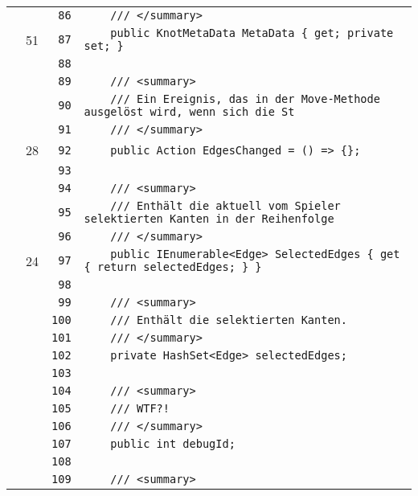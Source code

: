\documentclass[a4paper,10pt]{article}
\begin{document}
\begin{longtable}[l]{lrrl}
\cellcolor{gray} &  & \verb~86~ & \verb~    /// </summary>~\\
\cellcolor{green} & 51 & \verb~87~ & \verb~    public KnotMetaData MetaData { get; private set; }~\\
\cellcolor{gray} &  & \verb~88~ & \verb~~\\
\cellcolor{gray} &  & \verb~89~ & \verb~    /// <summary>~\\
\cellcolor{gray} &  & \verb~90~ & \verb~    /// Ein Ereignis, das in der Move-Methode ausgelöst wird, wenn sich die St~\\
\cellcolor{gray} &  & \verb~91~ & \verb~    /// </summary>~\\
\cellcolor{green} & 28 & \verb~92~ & \verb~    public Action EdgesChanged = () => {};~\\
\cellcolor{gray} &  & \verb~93~ & \verb~~\\
\cellcolor{gray} &  & \verb~94~ & \verb~    /// <summary>~\\
\cellcolor{gray} &  & \verb~95~ & \verb~    /// Enthält die aktuell vom Spieler selektierten Kanten in der Reihenfolge~\\
\cellcolor{gray} &  & \verb~96~ & \verb~    /// </summary>~\\
\cellcolor{green} & 24 & \verb~97~ & \verb~    public IEnumerable<Edge> SelectedEdges { get { return selectedEdges; } }~\\
\cellcolor{gray} &  & \verb~98~ & \verb~~\\
\cellcolor{gray} &  & \verb~99~ & \verb~    /// <summary>~\\
\cellcolor{gray} &  & \verb~100~ & \verb~    /// Enthält die selektierten Kanten.~\\
\cellcolor{gray} &  & \verb~101~ & \verb~    /// </summary>~\\
\cellcolor{gray} &  & \verb~102~ & \verb~    private HashSet<Edge> selectedEdges;~\\
\cellcolor{gray} &  & \verb~103~ & \verb~~\\
\cellcolor{gray} &  & \verb~104~ & \verb~    /// <summary>~\\
\cellcolor{gray} &  & \verb~105~ & \verb~    /// WTF?!~\\
\cellcolor{gray} &  & \verb~106~ & \verb~    /// </summary>~\\
\cellcolor{gray} &  & \verb~107~ & \verb~    public int debugId;~\\
\cellcolor{gray} &  & \verb~108~ & \verb~~\\
\cellcolor{gray} &  & \verb~109~ & \verb~    /// <summary>~\\

\end{longtable}
\end{document}
